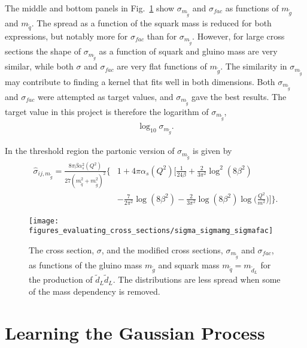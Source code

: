 \documentclass[twoside,english]{uiofysmaster}
\begin{document}
{The middle and bottom panels in Fig.~\ref{Fig:: evaluating cross : Comparison sigma and sigma/m} show $\sigma_{m_{\widetilde{g}}}$ and $\sigma_{fac}$ as functions of $m_{\widetilde{g}}$ and $m_{\widetilde{q}}$. The spread as a function of the squark mass is reduced for both expressions, but notably more for $\sigma_{fac}$ than for $\sigma_{m_{\widetilde{g}}}$. However, for large cross sections the shape of $\sigma_{m_{\widetilde{g}}}$ as a function of squark and gluino mass are very similar, while both $\sigma$ and $\sigma_{fac}$ are very flat functions of $m_{\widetilde{g}}$. The similarity in $\sigma_{m_{\widetilde{g}}}$ may contribute to finding a kernel that fits well in both dimensions. Both $\sigma_{m_{\widetilde{g}}}$ and $\sigma_{fac}$ were attempted as target values, and $\sigma_{m_{\widetilde{g}}}$ gave the best results. The target value in this project is therefore the logarithm of $\sigma_{m_{\widetilde{g}}}$,
\begin{align}
\log_{10} \sigma_{m_{\widetilde{g}}}.
\end{align}

In the threshold region the partonic version of $\sigma_{m_{\widetilde{g}}}$ is given by
\begin{align}
\hat{\sigma}_{ij, m_{\widetilde{g}}} =  \frac{8 \pi \beta \alpha^2_s (Q^2)}{27(m_{\widetilde{q}}^2 + m_{\widetilde{g}}^2)^2} \Bigg\{&1 
 + 4 \pi \alpha_s (Q^2) \Bigg[ \frac{1}{24 \beta} 
 + \frac{2}{3 \pi^2} \log^2(8 \beta^2) \nonumber \\& - \frac{7}{2 \pi^2} \log (8 \beta^2)
- \frac{2}{3 \pi^2} \log (8 \beta^2) \log \Big( \frac{Q^2}{m^2} \Big) \Bigg] \Bigg\}.
\end{align}



\begin{figure}
\texttt{[image: figures\_evaluating\_cross\_sections/sigma\_sigmamg\_sigmafac]}
\caption{The cross section, $\sigma$, and the modified cross sections, $\sigma_{m_{\widetilde{g}}}$ and $\sigma_{fac}$,  as functions of the gluino mass $m_{\widetilde{g}}$ and squark mass $m_{\widetilde{q}} = m_{\widetilde{d}_L}$ for the production of $\widetilde{d}_L \widetilde{d}_L$. The distributions are less spread when some of the mass dependency is removed.}
\label{Fig:: evaluating cross : Comparison sigma and sigma/m}
\end{figure}

\section{Learning the Gaussian Process}

}
\end{document}
